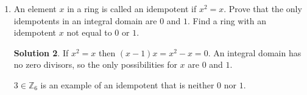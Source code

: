 \documentclass{article}
\newcommand{\ZZ}{\mathbb{Z}}
\theoremstyle{definition}
\newtheorem*{solution}{Solution}
\begin{document}
\begin{enumerate}
\begin{solution}
\end{solution}
\item[16.38.] An element $x$ in a ring is called an idempotent if $x^2 = x$. Prove that the only idempotents in an integral domain are $0$ and $1$. Find a ring with an idempotent $x$ not equal to $0$ or $1$. 
\begin{solution}
If $x^2 = x$ then $(x-1)x = x^2 - x = 0$.  An integral domain has no zero divisors, so the only possibilities for $x$ are $0$ and $1$.

$3 \in \ZZ_6$ is an example of an idempotent that is neither $0$ nor $1$.
\end{solution}
\end{enumerate}
\end{document}
